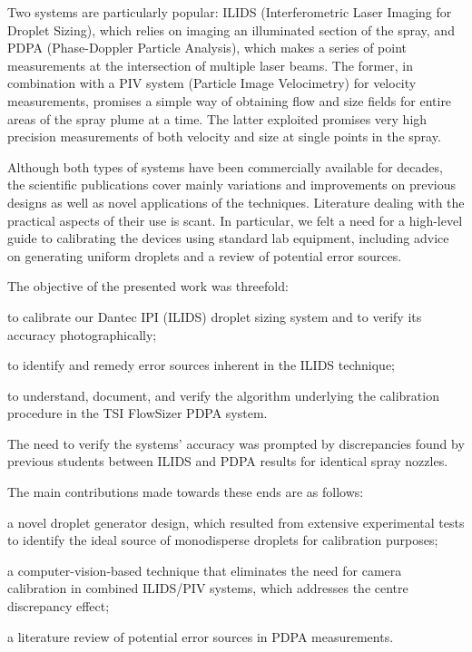 \documentclass[11.5pt,oneside]{book}
\begin{document}
Two systems are particularly popular: ILIDS (Interferometric Laser Imaging for
Droplet Sizing), which relies on imaging an illuminated section of the spray,
and PDPA (Phase-Doppler Particle Analysis), which makes a series of point
measurements at the intersection of multiple laser beams. The former, in
combination with a PIV system (Particle Image Velocimetry) for velocity
measurements, promises a simple way of obtaining flow and size fields for entire
areas of the spray plume at a time. The latter exploited 
promises very high precision measurements of both velocity and size at single
points in the spray.

Although both types of systems have been commercially available for decades, the
scientific publications cover mainly variations and improvements on previous
designs as well as novel applications of the techniques. Literature dealing with
the practical aspects of their use is scant. In particular, we felt a need for
a high-level guide to calibrating the devices using standard lab equipment,
including advice on generating uniform droplets and a review of potential error
sources.

The objective of the presented work was threefold:
\begin{alist}
\item to calibrate our Dantec IPI (ILIDS) droplet sizing system and to verify
        its accuracy photographically;
\item to identify and remedy error sources inherent in the ILIDS technique;
\item to understand, document, and verify the algorithm underlying the
        calibration procedure in the TSI FlowSizer PDPA system.
\end{alist}

The need to verify the systems' accuracy was prompted by discrepancies found by
previous students between ILIDS and PDPA results for identical spray nozzles.

The main contributions made towards these ends are as follows:
\begin{alist}
\item a novel droplet generator design, which resulted from extensive
        experimental tests to identify the ideal source of monodisperse droplets
        for calibration purposes;
\item a computer-vision-based technique that eliminates the need for camera
        calibration in combined ILIDS/PIV systems, which addresses the centre
        discrepancy effect;
\item a literature review of potential error sources in PDPA
        measurements.
\end{alist}
\end{document}
